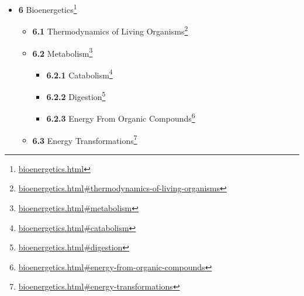 \documentclass[
]{article}
\providecommand{\tightlist}{%
  \setlength{\itemsep}{0pt}\setlength{\parskip}{0pt}}
\providecommand{\tightlist}{%
  \setlength{\itemsep}{0pt}\setlength{\parskip}{0pt}}
\let\rmarkdownfootnote\footnote%
\def\footnote{\protect\rmarkdownfootnote}
\renewcommand{\href}[2]{#2\footnote{\url{#1}}}
\theoremstyle{definition}
\theoremstyle{definition}
\theoremstyle{definition}
\theoremstyle{remark}
\begin{document}
\begin{itemize}
\begin{itemize}
    \begin{itemize}
    \tightlist
    \item
      \href{the-cell-membrane-1.html\#anchoring-junctions}{\emph{}\textbf{5.4.1}
      Anchoring Junctions}
    \item
      \href{the-cell-membrane-1.html\#desmosomes}{\emph{}\textbf{5.4.2}
      Desmosomes}
    \item
      \href{the-cell-membrane-1.html\#hemidesmosomes}{\emph{}\textbf{5.4.3}
      Hemidesmosomes}
    \item
      \href{the-cell-membrane-1.html\#adherens-junctions}{\emph{}\textbf{5.4.4}
      Adherens Junctions}
    \item
      \href{the-cell-membrane-1.html\#communicating-gap-junctions}{\emph{}\textbf{5.4.5}
      Communicating (gap) Junctions}
    \item
      \href{the-cell-membrane-1.html\#tight-junctions}{\emph{}\textbf{5.4.6}
      Tight Junctions}
    \item
      \href{the-cell-membrane-1.html\#cell-junction-molecules}{\emph{}\textbf{5.4.7}
      Cell Junction Molecules}
    \end{itemize}
  \end{itemize}
\item
  \href{bioenergetics.html}{\emph{}\textbf{6} Bioenergetics}

  \begin{itemize}
  \tightlist
  \item
    \href{bioenergetics.html\#thermodynamics-of-living-organisms}{\emph{}\textbf{6.1}
    Thermodynamics of Living Organisms}
  \item
    \href{bioenergetics.html\#metabolism}{\emph{}\textbf{6.2}
    Metabolism}

    \begin{itemize}
    \tightlist
    \item
      \href{bioenergetics.html\#catabolism}{\emph{}\textbf{6.2.1}
      Catabolism}
    \item
      \href{bioenergetics.html\#digestion}{\emph{}\textbf{6.2.2}
      Digestion}
    \item
      \href{bioenergetics.html\#energy-from-organic-compounds}{\emph{}\textbf{6.2.3}
      Energy From Organic Compounds}
    \end{itemize}
  \item
    \href{bioenergetics.html\#energy-transformations}{\emph{}\textbf{6.3}
    Energy Transformations}


\end{itemize}
\end{itemize}
\end{document}
